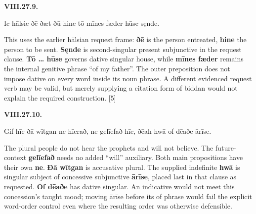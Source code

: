 \par\begin{minipage}{\linewidth}\raggedright
\textbf{VIII.27.9.}

Ic hālsie ðē ðæt ðū hine tō mīnes fæder hūse sęnde.

This uses the earlier hālsian request frame: \textbf{ðē} is the person entreated, \textbf{hine} the person to be sent. \textbf{Sęnde} is second-singular present subjunctive in the request clause. \textbf{Tō … hūse} governs dative singular house, while \textbf{mīnes fæder} remains the internal genitive phrase “of my father”. The outer preposition does not impose dative on every word inside its noun phrase. A different evidenced request verb may be valid, but merely supplying a citation form of biddan would not explain the required construction. [5]

\end{minipage}\par\addvspace{4pt}

\par\begin{minipage}{\linewidth}\raggedright
\textbf{VIII.27.10.}

Gif hīe ðā wītgan ne hīerað, ne gelīefað hīe, ðēah hwā of dēaðe ārīse.

The plural people do not hear the prophets and will not believe. The future-context \textbf{gelīefað} needs no added “will” auxiliary. Both main propositions have their own \textbf{ne}. \textbf{Ðā wītgan} is accusative plural. The supplied indefinite \textbf{hwā} is singular subject of concessive subjunctive \textbf{ārīse}, placed last in that clause as requested. \textbf{Of dēaðe} has dative singular. An indicative would not meet this concession's taught mood; moving ārīse before its of phrase would fail the explicit word-order control even where the resulting order was otherwise defensible.

\end{minipage}\par\addvspace{4pt}

